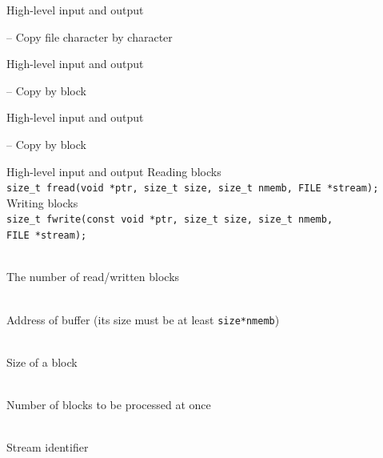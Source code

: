\documentclass[usenames,dvipsnames,aspectratio=169]{beamer}
\begin{document}
\begin{frame}[fragile]{High-level input and output}
  \begin{exampleblock}{ -- Copy file character by character}
    
  \end{exampleblock}
\end{frame}

\begin{frame}[fragile]{High-level input and output}
  \footnotesize
  \begin{exampleblock}{ -- Copy by block}
    
  \end{exampleblock}
\end{frame}

\begin{frame}[fragile]{High-level input and output}
  \scriptsize
  \begin{exampleblock}{ -- Copy by block}
    
  \end{exampleblock}
\end{frame}

\begin{frame}{High-level input and output}
  Reading blocks\\
  \footnotesize
  \texttt{size\_t fread(void *ptr, size\_t size, size\_t nmemb, FILE *stream);} \\
  \normalsize
  Writing blocks\\
  \footnotesize
  \texttt{size\_t fwrite(const void *ptr, size\_t size, size\_t nmemb, \\ \qquad FILE *stream);} \\
  \begin{description}[mm]
    \item[Return value] \hfill \\
      The number of read/written blocks
    \item[\texttt{ptr}] \hfill \\
      Address of buffer (its size must be at least \texttt{size*nmemb})
    \item[\texttt{size}] \hfill \\
      Size of a block
    \item[\texttt{nmemb}] \hfill \\
      Number of blocks to be processed at once
    \item[\texttt{stream}] \hfill \\
      Stream identifier
  \end{description}
\end{frame}
\end{document}
